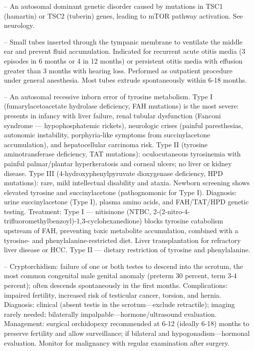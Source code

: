 -- An autosomal dominant genetic disorder caused by mutations in TSC1 (hamartin) or TSC2 (tuberin) genes, leading to mTOR pathway activation. See neurology.

-- Small tubes inserted through the tympanic membrane to ventilate the middle ear and prevent fluid accumulation. Indicated for recurrent acute otitis media (3 episodes in 6 months or 4 in 12 months) or persistent otitis media with effusion greater than 3 months with hearing loss. Performed as outpatient procedure under general anesthesia. Most tubes extrude spontaneously within 6-18 months.

-- An autosomal recessive inborn error of tyrosine metabolism. Type I (fumarylacetoacetate hydrolase deficiency, FAH mutations) is the most severe: presents in infancy with liver failure, renal tubular dysfunction (Fanconi syndrome — hypophosphatemic rickets), neurologic crises (painful paresthesias, autonomic instability, porphyria-like symptoms from succinylacetone accumulation), and hepatocellular carcinoma risk. Type II (tyrosine aminotransferase deficiency, TAT mutations): oculocutaneous tyrosinemia with painful palmar/plantar hyperkeratosis and corneal ulcers; no liver or kidney disease. Type III (4-hydroxyphenylpyruvate dioxygenase deficiency, HPD mutations): rare, mild intellectual disability and ataxia. Newborn screening shows elevated tyrosine and succinylacetone (pathognomonic for Type I). Diagnosis: urine succinylacetone (Type I), plasma amino acids, and FAH/TAT/HPD genetic testing. Treatment: Type I — nitisinone (NTBC, 2-(2-nitro-4-trifluoromethylbenzoyl)-1,3-cyclohexanedione) blocks tyrosine catabolism upstream of FAH, preventing toxic metabolite accumulation, combined with a tyrosine- and phenylalanine-restricted diet. Liver transplantation for refractory liver disease or HCC. Type II — dietary restriction of tyrosine and phenylalanine.

-- Cryptorchidism: failure of one or both testes to descend into the scrotum, the most common congenital male genital anomaly (preterm 30 percent, term 3-4 percent); often descends spontaneously in the first months. Complications: impaired fertility, increased risk of testicular cancer, torsion, and hernia. Diagnosis: clinical (absent testis in the scrotum—exclude retractile); imaging rarely needed; bilaterally impalpable—hormone/ultrasound evaluation. Management: surgical orchidopexy recommended at 6-12 (ideally 6-18) months to preserve fertility and allow surveillance; if bilateral and hypogonadism—hormonal evaluation. Monitor for malignancy with regular examination after surgery.

